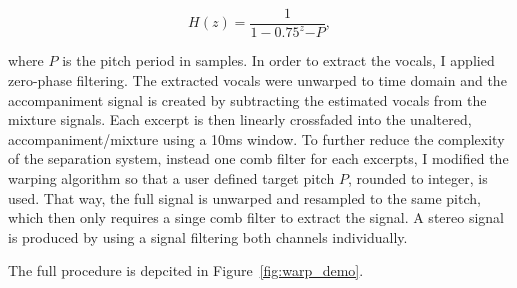 \begin{equation}
  H(z) = \frac{1}{1 - 0.75^z{-P}},
\end{equation}

where \(P\) is the pitch period in samples.
In order to extract the vocals, I applied zero-phase filtering.
The extracted vocals were unwarped to time domain and the accompaniment signal is created by subtracting the estimated vocals from the mixture signals.
Each excerpt is then linearly crossfaded into the unaltered, accompaniment/mixture using a 10ms window.
To further reduce the complexity of the separation system, instead one comb filter for each excerpts, I modified the warping algorithm so that a user defined target pitch \(P\), rounded to integer, is used.
That way, the full signal is unwarped and resampled to the same pitch, which then only requires a singe comb filter to extract the signal.
A stereo signal is produced by using a signal filtering both channels individually.

The full procedure is depcited in Figure~\ref{fig:warp_demo}.

